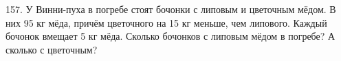 157. У Винни-пуха в погребе стоят бочонки с липовым и цветочным мёдом. В них 95 кг мёда, причём цветочного на 15 кг меньше, чем липового. Каждый бочонок вмещает 5 кг мёда. Сколько бочонков с липовым мёдом в погребе? А сколько с цветочным?\\

